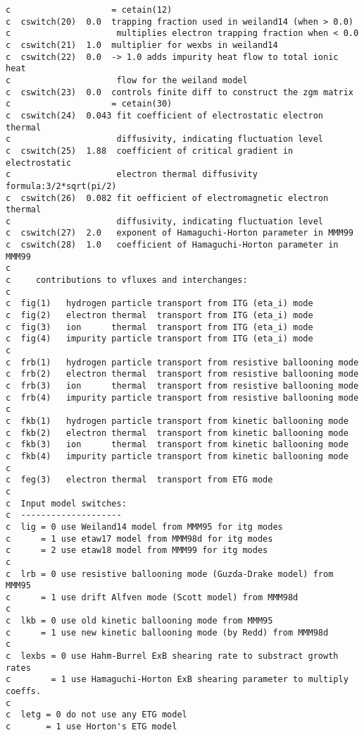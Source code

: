 \begin{verbatim}
c                    = cetain(12)
c  cswitch(20)  0.0  trapping fraction used in weiland14 (when > 0.0)
c                     multiplies electron trapping fraction when < 0.0
c  cswitch(21)  1.0  multiplier for wexbs in weiland14
c  cswitch(22)  0.0  -> 1.0 adds impurity heat flow to total ionic heat
c                     flow for the weiland model
c  cswitch(23)  0.0  controls finite diff to construct the zgm matrix
c                    = cetain(30)
c  cswitch(24)  0.043 fit coefficient of electrostatic electron thermal
c                     diffusivity, indicating fluctuation level
c  cswitch(25)  1.88  coefficient of critical gradient in electrostatic
c                     electron thermal diffusivity formula:3/2*sqrt(pi/2)
c  cswitch(26)  0.082 fit oefficient of electromagnetic electron thermal
c                     diffusivity, indicating fluctuation level
c  cswitch(27)  2.0   exponent of Hamaguchi-Horton parameter in MMM99
c  cswitch(28)  1.0   coefficient of Hamaguchi-Horton parameter in MMM99
c
c     contributions to vfluxes and interchanges:
c
c  fig(1)   hydrogen particle transport from ITG (eta_i) mode
c  fig(2)   electron thermal  transport from ITG (eta_i) mode
c  fig(3)   ion      thermal  transport from ITG (eta_i) mode
c  fig(4)   impurity particle transport from ITG (eta_i) mode
c
c  frb(1)   hydrogen particle transport from resistive ballooning mode
c  frb(2)   electron thermal  transport from resistive ballooning mode
c  frb(3)   ion      thermal  transport from resistive ballooning mode
c  frb(4)   impurity particle transport from resistive ballooning mode
c
c  fkb(1)   hydrogen particle transport from kinetic ballooning mode
c  fkb(2)   electron thermal  transport from kinetic ballooning mode
c  fkb(3)   ion      thermal  transport from kinetic ballooning mode
c  fkb(4)   impurity particle transport from kinetic ballooning mode
c
c  feg(3)   electron thermal  transport from ETG mode
c
c  Input model switches:
c  --------------------
c  lig = 0 use Weiland14 model from MMM95 for itg modes
c      = 1 use etaw17 model from MMM98d for itg modes
c      = 2 use etaw18 model from MMM99 for itg modes
c
c  lrb = 0 use resistive ballooning mode (Guzda-Drake model) from MMM95
c      = 1 use drift Alfven mode (Scott model) from MMM98d
c
c  lkb = 0 use old kinetic ballooning mode from MMM95
c      = 1 use new kinetic ballooning mode (by Redd) from MMM98d
c
c  lexbs = 0 use Hahm-Burrel ExB shearing rate to substract growth rates
c        = 1 use Hamaguchi-Horton ExB shearing parameter to multiply coeffs.
c
c  letg = 0 do not use any ETG model
c       = 1 use Horton's ETG model

\end{verbatim}
